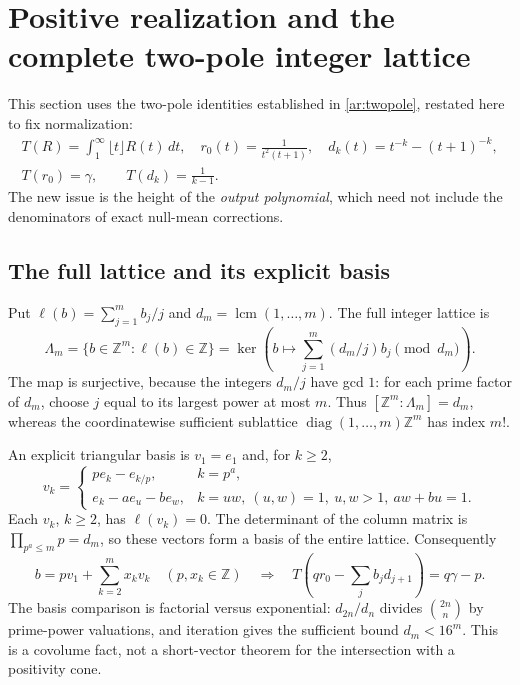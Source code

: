 \documentclass[11pt,a4paper]{article}
\newcommand{\Z}{\mathbb Z}
\theoremstyle{definition}
\theoremstyle{remark}
\numberwithin{equation}{section}
\begin{document}
\section{Positive realization and the complete two-pole integer lattice}
\label{inf:sec:positive}
This section uses the two-pole identities established in \eqref{ar:twopole}, restated here to fix normalization:
\[
\begin{gathered}
 T(R)=\int_1^\infty\lfloor t\rfloor R(t)\,dt,\quad
 r_0(t)=\frac1{t^2(t+1)},\quad d_k(t)=t^{-k}-(t+1)^{-k},\\
 T(r_0)=\gamma,\qquad T(d_k)=\frac1{k-1}.
\end{gathered}
\]
The new issue is the height of the \emph{output polynomial}, which need not include the denominators of exact null-mean corrections.

\subsection{The full lattice and its explicit basis}
\label{inf:sub:full-lattice}
Put $\ell(b)=\sum_{j=1}^mb_j/j$ and $d_m=\operatorname{lcm}(1,\ldots,m)$. The full integer lattice is
\[
 \Lambda_m=\{b\in\Z^m:\ell(b)\in\Z\}
 =\ker\left(b\longmapsto\sum_{j=1}^m(d_m/j)b_j\pmod{d_m}\right).
\]
The map is surjective, because the integers $d_m/j$ have gcd $1$: for each prime factor of $d_m$, choose $j$ equal to its largest power at most $m$. Thus $[\Z^m:\Lambda_m]=d_m$, whereas the coordinatewise sufficient sublattice $\operatorname{diag}(1,\ldots,m)\Z^m$ has index $m!$.

An explicit triangular basis is $v_1=e_1$ and, for $k\ge2$,
\[
 v_k=\begin{cases}
 pe_k-e_{k/p},&k=p^a,\\
 e_k-ae_u-be_w,&k=uw,\ (u,w)=1,\ u,w>1,\ aw+bu=1.
 \end{cases}
\]
Each $v_k$, $k\ge2$, has $\ell(v_k)=0$. The determinant of the column matrix is $\prod_{p^a\le m}p=d_m$, so these vectors form a basis of the entire lattice. Consequently
\[
 b=pv_1+\sum_{k=2}^mx_kv_k\quad(p,x_k\in\Z)
 \quad\Longrightarrow\quad T\left(qr_0-\sum_jb_jd_{j+1}\right)=q\gamma-p.
\]
The basis comparison is factorial versus exponential: $d_{2n}/d_n$ divides $\binom{2n}{n}$ by prime-power valuations, and iteration gives the sufficient bound $d_m<16^m$. This is a covolume fact, not a short-vector theorem for the intersection with a positivity cone.
\end{document}
